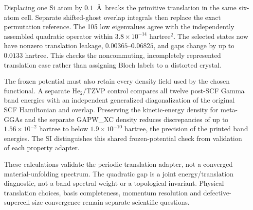 Displacing one Si atom by $0.1$~\AA\ breaks the primitive
translation in the same six-atom cell. Separate shifted-ghost
overlap integrals then replace the exact permutation reference.
The 105 low eigenvalues agree with the independently assembled
quadratic operator within $3.8\times10^{-14}$ hartree$^2$.
The selected states now have nonzero translation leakage,
$0.00365$--$0.06825$, and gaps change by up to
$0.0133$ hartree. This checks the noncommuting, incompletely
represented translation case rather than assigning Bloch labels
to a distorted crystal.

The frozen potential must also retain every density field used
by the chosen functional. A separate He$_2$/TZVP control compares
all twelve post-SCF Gamma band energies with an independent
generalized diagonalization of the original SCF Hamiltonian and
overlap. Preserving the kinetic-energy density for meta-GGAs and
the separate GAPW\_XC density reduces discrepancies of up to
$1.56\times10^{-2}$ hartree to below $1.9\times10^{-10}$ hartree,
the precision of the printed band energies. The SI distinguishes
this shared frozen-potential check from validation of each
property adapter.

These calculations validate the periodic translation adapter,
not a converged material-unfolding spectrum. The quadratic gap is
a joint energy/translation diagnostic, not a band spectral weight
or a topological invariant. Physical translation choices, basis
completeness, momentum resolution and defective-supercell
size convergence remain separate scientific questions.
